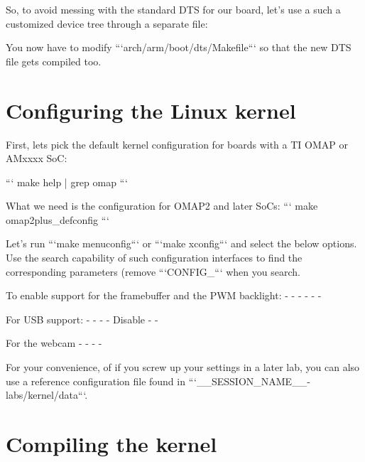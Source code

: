 So, to avoid messing with the standard DTS for our board, let's use a
such a customized device tree through a separate file:


You now have to modify ```arch/arm/boot/dts/Makefile``` so that
the new DTS file gets compiled too.

\section{Configuring the Linux kernel}

First, lets pick the default kernel configuration for boards with a TI
OMAP or AMxxxx SoC:

```
make help | grep omap
```

What we need is the configuration for OMAP2 and later SoCs:
```
make omap2plus_defconfig
```

Let's run ```make menuconfig``` or ```make xconfig``` and select the
below options. Use the search capability of such configuration
interfaces to find the corresponding parameters (remove ```CONFIG_```
when you search.

To enable support for the framebuffer and the PWM backlight:
 -  
 -  
 -  
 -  
 -  
 -  

For USB support:
 -  
 -  
 -  
 -  Disable 
 -  
 -  

For the webcam
 -   
 -  
 -  
 -  

For your convenience, of if you screw up your settings in a later lab,
you can also use a reference configuration file found in
```__SESSION_NAME__-labs/kernel/data```.

\section{Compiling the kernel}

